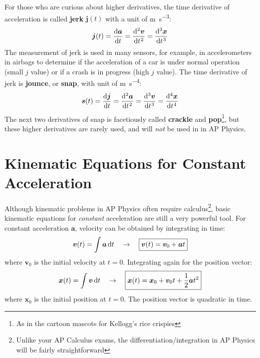 \documentclass{../../oss-handout}
\begin{document}
For those who are curious about higher derivatives, the time derivative of
acceleration is called \textbf{jerk} $\bm{j}(t)$ with a unit of
\si{\metre\per\second\cubed}:
\begin{equation}
  \bm{j}(t)=\diff{\bm{a}}t=\diff[2]{\bm{v}}t=\diff[3]{\bm{x}}t
\end{equation}
The measurement of jerk is used in many sensors, for example, in accelerometers
in airbags to determine if the acceleration of a car is under normal operation
(small $j$ value) or if a crash is in progress (high $j$ value). The time
derivative of jerk is \textbf{jounce}, or \textbf{snap}, with unit of
\si{\metre\per\second^4}:
\begin{equation}
  \bm{s}(t)=\diff{\bm{j}}t=\diff[2]{\bm{a}}t=\diff[3]{\bm{v}}t=\diff[4]{\bm{x}}t
\end{equation}
The next two derivatives of snap is facetiously called \textbf{crackle} and
\textbf{pop}\footnote{As in the cartoon mascots for Kellogg's rice crispies},
but these higher derivatives are rarely used, and will \emph{not} be used in
in AP Physics.



\section{Kinematic Equations for Constant Acceleration}

Although kinematic problems in AP Physics often require calculus\footnote{Unlike
  your AP Calculus exams, the differentiation/integration in AP Physics will be
  fairly straightforward}, basic kinematic equations for \emph{constant}
acceleration are still a very powerful tool. For constant acceleration
$\bm{a}$, velocity can be obtained by integrating in time:
\begin{equation}
  \bm{v}(t)=\int\bm{a}\dl t\quad\rightarrow\quad
  \boxed{\bm{v}(t)=\bm{v}_0+\bm{a}t}
  \label{eq:big5-1}
\end{equation}
where $\bm{v}_0$ is the initial velocity at $t=0$. Integrating again for the
position vector:
\begin{equation}
  \bm{x}(t)=\int \bm{v}\dl t\quad\rightarrow\quad
  \boxed{\bm{x}(t)=\bm{x}_0+\bm{v}_0t+\frac12 \bm{a}t^2}
  \label{eq:big5-2}
\end{equation}
where $\bm{x}_0$ is the initial position at $t=0$. The position vector is
quadratic in time.
\end{document}
